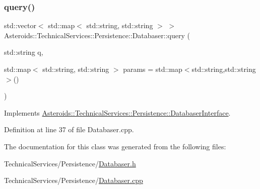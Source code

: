 \subsubsection{\texorpdfstring{query()}{query()}}
{\footnotesize\ttfamily std\+::vector$<$ std\+::map$<$ std\+::string, std\+::string $>$ $>$ Asteroids\+::\+Technical\+Services\+::\+Persistence\+::\+Databaser\+::query (\begin{DoxyParamCaption}\item[{std\+::string}]{q,  }\item[{std\+::map$<$ std\+::string, std\+::string $>$}]{params = {\ttfamily std\+:\+:map$<$std\+:\+:string,std\+:\+:string$>$()} }\end{DoxyParamCaption})\hspace{0.3cm}{\ttfamily [virtual]}}



Implements \hyperlink{classAsteroids_1_1TechnicalServices_1_1Persistence_1_1DatabaserInterface_a8405defffe62181ae654b65bbe45d1c9}{Asteroids\+::\+Technical\+Services\+::\+Persistence\+::\+Databaser\+Interface}.



Definition at line 37 of file Databaser.\+cpp.



The documentation for this class was generated from the following files\+:\begin{DoxyCompactItemize}
\item 
Technical\+Services/\+Persistence/\hyperlink{Databaser_8h}{Databaser.\+h}\item 
Technical\+Services/\+Persistence/\hyperlink{Databaser_8cpp}{Databaser.\+cpp}\end{DoxyCompactItemize}
